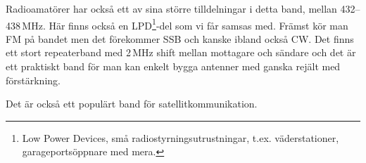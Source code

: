 Radioamatörer har också ett av sina större tilldelningar i detta band, mellan 432--438\,MHz. Här finns också en LPD\footnote{Low Power Devices, små radiostyrningsutrustningar, t.ex. väderstationer, garageportsöppnare med mera.}-del som vi får samsas med. Främst kör man FM på bandet men det förekommer SSB och kanske ibland också CW. Det finns ett stort repeaterband med 2\,MHz shift mellan mottagare och sändare och det är ett praktiskt band för man kan enkelt bygga antenner med ganska rejält med förstärkning.

Det är också ett populärt band för satellitkommunikation.
